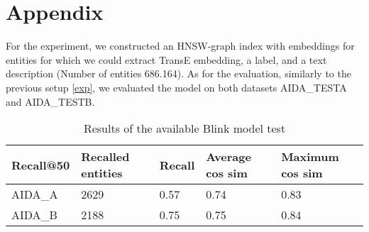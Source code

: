 \chapter{Appendix}
\label{apx}
For the experiment, we constructed an HNSW-graph index with embeddings for entities for which we could extract TransE embedding, a label, and a text description (Number of entities 686.164). As for the evaluation, similarly to the previous setup \ref{exp}, we evaluated the model on both datasets AIDA\_TESTA and AIDA\_TESTB.\newline

\begin{table}[h]
\begin{tabular}{ |p{3cm}||p{2.5cm}||p{2.5cm}|p{2.5cm}|p{2.5cm}|}
 \hline   
  Recall@50 & Recalled entities & Recall  & Average cos sim & Maximum cos sim\\
 \hline 
 AIDA\_A & 2629 & 0.57 & 0.74 & 0.83\\
 \hline
 AIDA\_B & 2188 & 0.75 & 0.75 & 0.84\\
 \hline
\end{tabular}
\caption{Results of the available Blink model test}
\label{lastT}
\end{table}
